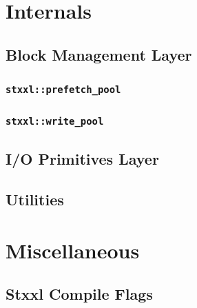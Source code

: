 \documentclass[twoside]{book}
\newcommand{\stxxl}{{\sc Stxxl} }
\begin{document}
\begin{lstlisting}

\end{lstlisting}

\chapter{Internals}
\section{Block Management Layer}

\subsection{\texttt{stxxl::prefetch\_pool}}
\label{prefetchpoolsection}
\subsection{\texttt{stxxl::write\_pool}}
\label{writepoolsection}

\section{I/O Primitives Layer}
\section{Utilities}


\chapter{Miscellaneous}
\section{\stxxl Compile Flags}

 
\end{document}
